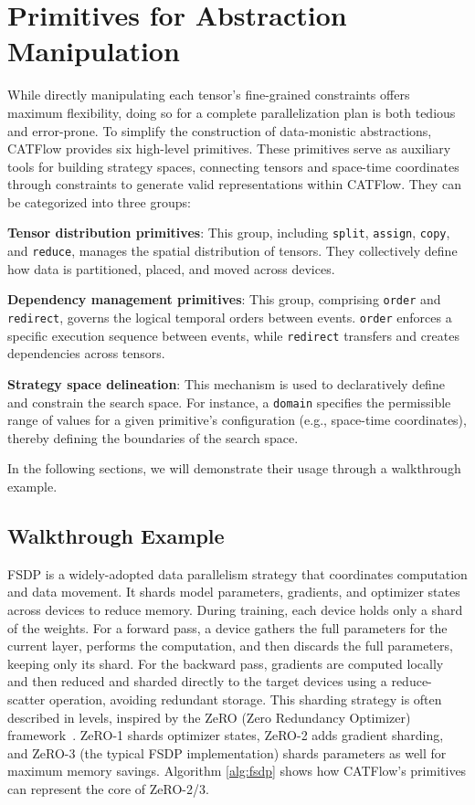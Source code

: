 \documentclass[letterpaper,twocolumn,10pt]{article}
\newcommand{\name}{CATFlow}
\begin{document}
\section{Primitives for Abstraction Manipulation}
\label{sec:primitives}

While directly manipulating each tensor's fine-grained constraints offers maximum flexibility, doing so for a complete parallelization plan is both tedious and error-prone. To simplify the construction of data-monistic abstractions, \name{} provides six high-level primitives. These primitives serve as auxiliary tools for building strategy spaces, connecting tensors and space-time coordinates through constraints to generate valid representations within \name{}. They can be categorized into three groups:

\textbf{Tensor distribution primitives}: This group, including \texttt{split}, \texttt{assign}, \texttt{copy}, and \texttt{reduce}, manages the spatial distribution of tensors. They collectively define how data is partitioned, placed, and moved across devices.

\textbf{Dependency management primitives}: This group, comprising \texttt{order} and \texttt{redirect}, governs the logical temporal orders between events. \texttt{order} enforces a specific execution sequence between events, while \texttt{redirect} transfers and creates dependencies across tensors.

\textbf{Strategy space delineation}: This mechanism is used to declaratively define and constrain the search space. For instance, a \texttt{domain} specifies the permissible range of values for a given primitive's configuration (e.g., space-time coordinates), thereby defining the boundaries of the search space.

In the following sections, we will demonstrate their usage through a walkthrough example.

\subsection{Walkthrough Example}

FSDP is a widely-adopted data parallelism strategy that coordinates computation and data movement. It shards model parameters, gradients, and optimizer states across devices to reduce memory. During training, each device holds only a shard of the weights. For a forward pass, a device gathers the full parameters for the current layer, performs the computation, and then discards the full parameters, keeping only its shard. For the backward pass, gradients are computed locally and then reduced and sharded directly to the target devices using a reduce-scatter operation, avoiding redundant storage. This sharding strategy is often described in levels, inspired by the ZeRO (Zero Redundancy Optimizer) framework~\cite{rajbhandari2020zero}. ZeRO-1 shards optimizer states, ZeRO-2 adds gradient sharding, and ZeRO-3 (the typical FSDP implementation) shards parameters as well for maximum memory savings. Algorithm \ref{alg:fsdp} shows how \name{}'s primitives can represent the core of ZeRO-2/3. 
\end{document}
